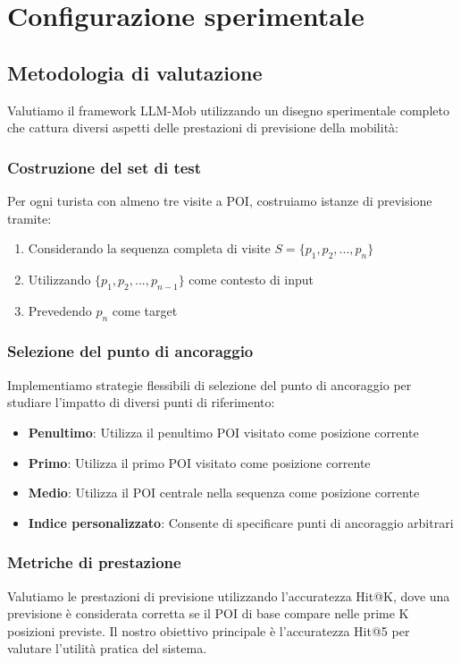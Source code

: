 \section{Configurazione sperimentale}

\subsection{Metodologia di valutazione}

Valutiamo il framework LLM-Mob utilizzando un disegno sperimentale completo che cattura diversi aspetti delle prestazioni di previsione della mobilità:

\subsubsection{Costruzione del set di test}
Per ogni turista con almeno tre visite a POI, costruiamo istanze di previsione tramite:
\begin{enumerate}
\item Considerando la sequenza completa di visite $S = \{p_1, p_2, ..., p_n\}$
\item Utilizzando $\{p_1, p_2, ..., p_{n-1}\}$ come contesto di input
\item Prevedendo $p_n$ come target
\end{enumerate}

\subsubsection{Selezione del punto di ancoraggio}
Implementiamo strategie flessibili di selezione del punto di ancoraggio per studiare l'impatto di diversi punti di riferimento:
\begin{itemize}
\item \textbf{Penultimo}: Utilizza il penultimo POI visitato come posizione corrente
\item \textbf{Primo}: Utilizza il primo POI visitato come posizione corrente
\item \textbf{Medio}: Utilizza il POI centrale nella sequenza come posizione corrente
\item \textbf{Indice personalizzato}: Consente di specificare punti di ancoraggio arbitrari
\end{itemize}

\subsubsection{Metriche di prestazione}
Valutiamo le prestazioni di previsione utilizzando l'accuratezza Hit@K, dove una previsione è considerata corretta se il POI di base compare nelle prime K posizioni previste. Il nostro obiettivo principale è l'accuratezza Hit@5 per valutare l'utilità pratica del sistema.

